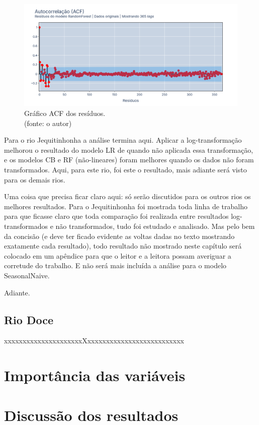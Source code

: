 \begin{figure}[!h]
\centering
\includegraphics[scale=0.33]{Figuras/jequiti/resultados/RF_WFV_ORIG_RESID_ACF.png}
\caption{Gráfico ACF dos resíduos.\\(fonte: o autor)}
\label{fig:jequiti_RF_WFV_ORIG_RESID_ACF}
\end{figure}
\clearpage

Para o rio Jequitinhonha a análise termina aqui. Aplicar a log-transformação melhorou o resultado do modelo LR de quando não aplicada essa transformação, e os modelos CB e RF (não-lineares) foram melhores quando os dados não foram transformados. Aqui, para este rio, foi este o resultado, mais adiante será visto para os demais rios.

Uma coisa que precisa ficar claro aqui: só serão discutidos para os outros rios os melhores resultados. Para o Jequitinhonha foi mostrada toda linha de trabalho para que ficasse claro que toda comparação foi realizada entre resultados log-transformados e não transformados, tudo foi estudado e analisado. Mas pelo bem da concisão (e deve ter ficado evidente as voltas dadas no texto mostrando exatamente cada resultado), todo resultado não mostrado neste capítulo será colocado em um apêndice para que o leitor e a leitora possam averiguar a corretude do trabalho. E não será mais incluída a análise para o modelo SeasonalNaive.

Adiante.

\subsection{Rio Doce}

xxxxxxxxxxxxxxxxxxxxxXxxxxxxxxxxxxxxxxxxxxxxxxxx

\section{Importância das variáveis}

\section{Discuss\~ao dos resultados}
